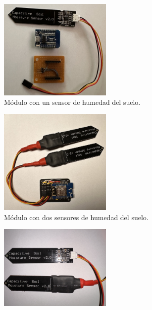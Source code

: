 \begin{figure}[!htpb]
     \centering
     \begin{subfigure}[b]{0.45\textwidth}
		\centering
		\includegraphics[width=0.60\textwidth]{./Figures/soil1.jpeg}
		\caption[Módulo con un sensor de humedad del suelo]{Módulo con un sensor de humedad del suelo.}
		\label{fig:soil1}
     \end{subfigure}
     \hfill
     \begin{subfigure}[b]{0.45\textwidth}
	\centering
		\includegraphics[width=0.60\textwidth]{./Figures/soil2.jpeg}
		\caption[Módulo con dos sensores de humedad del suelo]{Módulo con dos sensores de humedad del suelo.}
		\label{fig:soil2}
     \end{subfigure}
      \begin{subfigure}[b]{0.45\textwidth}
	\centering
		\includegraphics[width=0.60\textwidth]{./Figures/soil_compare.jpg}

\end{subfigure}
\end{figure}
